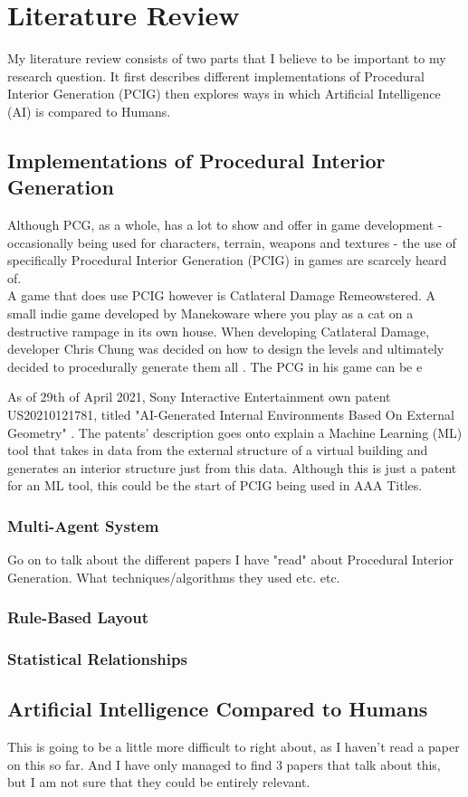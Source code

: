 \section{Literature Review}
My literature review consists of two parts that I believe to be important to my research question.
It first describes different implementations of Procedural Interior Generation (PCIG) then explores
ways in which Artificial Intelligence (AI) is compared to Humans.
\\
\subsection{Implementations of Procedural Interior Generation}
Although PCG, as a whole, has a lot to show and offer in game development - occasionally being used for
characters, terrain, weapons and textures - the use of specifically Procedural Interior Generation 
(PCIG) in games are scarcely heard  of.
\\
A game that does use PCIG however is Catlateral Damage Remeowstered\cite{game:catlateral}.
A small indie game developed by Manekoware where you play as a cat on a destructive rampage in its own house.
When developing Catlateral Damage, developer Chris Chung was decided on how to design the levels and ultimately decided to procedurally generate them all \cite{pcg_in_gd}.
The PCG in his game can be e

\bigskip
As of 29th of April 2021, Sony Interactive Entertainment own patent US20210121781, 
titled "AI-Generated Internal Environments Based On External Geometry" \cite{sony-patent}.
The patents' description goes onto explain a 
Machine Learning (ML) tool that takes in data from the external structure of a virtual building
and generates an interior structure just from this data.
Although this is just a patent for an ML tool, this could be the start of PCIG being used in AAA Titles. 



\subsubsection*{Multi-Agent System}
Go on to talk about the different papers I have "read" about Procedural Interior Generation.
What techniques/algorithms they used etc. etc. \cite{real-time-walkthroughs}
\subsubsection*{Rule-Based Layout}
\subsubsection*{Statistical Relationships}


\subsection{Artificial Intelligence Compared to Humans}
This is going to be a little more difficult to right about, as I haven't read a paper on this so far.
And I have only managed to find 3 papers that talk about this, but I am not sure that they could be entirely relevant.
